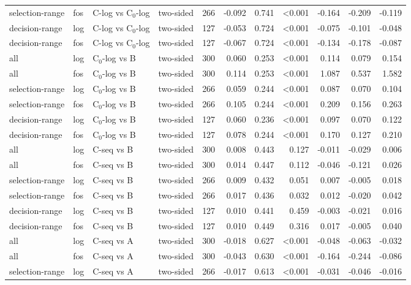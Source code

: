 \begin{longtable}{llllrrrrrrr}
selection-range & fos & C-log vs C$_0$-log & two-sided & 266 & -0.092 & 0.741 & <0.001 & -0.164 & -0.209 & -0.119 \\
decision-range & log & C-log vs C$_0$-log & two-sided & 127 & -0.053 & 0.724 & <0.001 & -0.075 & -0.101 & -0.048 \\
decision-range & fos & C-log vs C$_0$-log & two-sided & 127 & -0.067 & 0.724 & <0.001 & -0.134 & -0.178 & -0.087 \\
all & log & C$_0$-log vs B & two-sided & 300 & 0.060 & 0.253 & <0.001 & 0.114 & 0.079 & 0.154 \\
all & fos & C$_0$-log vs B & two-sided & 300 & 0.114 & 0.253 & <0.001 & 1.087 & 0.537 & 1.582 \\
selection-range & log & C$_0$-log vs B & two-sided & 266 & 0.059 & 0.244 & <0.001 & 0.087 & 0.070 & 0.104 \\
selection-range & fos & C$_0$-log vs B & two-sided & 266 & 0.105 & 0.244 & <0.001 & 0.209 & 0.156 & 0.263 \\
decision-range & log & C$_0$-log vs B & two-sided & 127 & 0.060 & 0.236 & <0.001 & 0.097 & 0.070 & 0.122 \\
decision-range & fos & C$_0$-log vs B & two-sided & 127 & 0.078 & 0.244 & <0.001 & 0.170 & 0.127 & 0.210 \\
all & log & C-seq vs B & two-sided & 300 & 0.008 & 0.443 & 0.127 & -0.011 & -0.029 & 0.006 \\
all & fos & C-seq vs B & two-sided & 300 & 0.014 & 0.447 & 0.112 & -0.046 & -0.121 & 0.026 \\
selection-range & log & C-seq vs B & two-sided & 266 & 0.009 & 0.432 & 0.051 & 0.007 & -0.005 & 0.018 \\
selection-range & fos & C-seq vs B & two-sided & 266 & 0.017 & 0.436 & 0.032 & 0.012 & -0.020 & 0.042 \\
decision-range & log & C-seq vs B & two-sided & 127 & 0.010 & 0.441 & 0.459 & -0.003 & -0.021 & 0.016 \\
decision-range & fos & C-seq vs B & two-sided & 127 & 0.010 & 0.449 & 0.316 & 0.017 & -0.005 & 0.040 \\
all & log & C-seq vs A & two-sided & 300 & -0.018 & 0.627 & <0.001 & -0.048 & -0.063 & -0.032 \\
all & fos & C-seq vs A & two-sided & 300 & -0.043 & 0.630 & <0.001 & -0.164 & -0.244 & -0.086 \\
selection-range & log & C-seq vs A & two-sided & 266 & -0.017 & 0.613 & <0.001 & -0.031 & -0.046 & -0.016 \\

\end{longtable}
